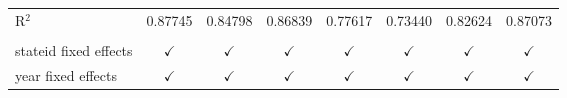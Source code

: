 \begin{table}[htbp]
\begin{tabular}{lccccccc}
      R$^2$                                         & 0.87745              & 0.84798       & 0.86839             & 0.77617                             & 0.73440           & 0.82624              & 0.87073\\  
       \\
      stateid fixed effects                         & $\checkmark$         & $\checkmark$  & $\checkmark$        & $\checkmark$                        & $\checkmark$      & $\checkmark$         & $\checkmark$\\   
      year fixed effects                            & $\checkmark$         & $\checkmark$  & $\checkmark$        & $\checkmark$                        & $\checkmark$      & $\checkmark$         & $\checkmark$\\   
      \bottomrule
   \end{tabular}
\end{table}



